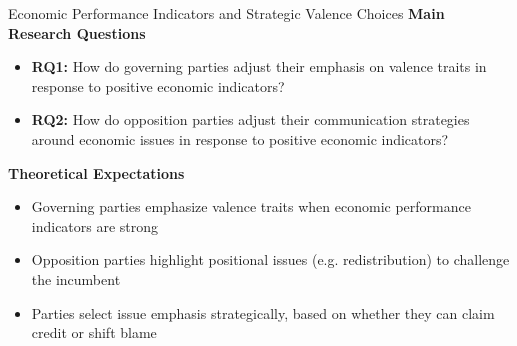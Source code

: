 \documentclass[9pt, aspectratio=169]{beamer}
\begin{document}
\begin{frame}{Economic Performance Indicators and Strategic Valence Choices}
    \textbf{Main Research Questions} \vspace{0.1cm}
    \begin{itemize}
        \item \textbf{RQ1:} How do governing parties adjust their emphasis on valence traits in response to positive economic indicators?\vspace{0.1cm}
        \item \textbf{RQ2:} How do opposition parties adjust their communication strategies around economic issues in response to positive economic indicators?
    \end{itemize}
    \vspace{0.4cm}
    \textbf{Theoretical Expectations}\vspace{0.1cm}
\begin{itemize}
    \item Governing parties emphasize valence traits when economic performance indicators are strong\vspace{0.1cm}
    \item Opposition parties highlight positional issues (e.g. redistribution) to challenge the incumbent\vspace{0.1cm}
    \item Parties select issue emphasis strategically, based on whether they can claim credit or shift blame
\end{itemize}   
    \end{frame}
\end{document}
